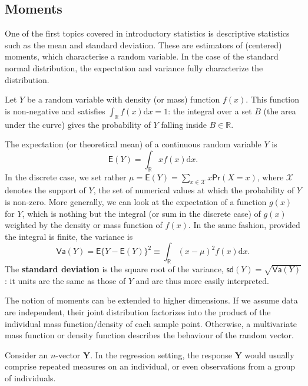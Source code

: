 \documentclass[
  11pt,
  letterpaper,
]{book}
\theoremstyle{definition}
\theoremstyle{definition}
\theoremstyle{definition}
\theoremstyle{definition}
\theoremstyle{remark}
\begin{document}
\hypertarget{moments}{%
\subsection{Moments}\label{moments}}

One of the first topics covered in introductory statistics is descriptive statistics such as the mean and standard deviation. These are estimators of (centered) moments, which characterise a random variable. In the case of the standard normal distribution, the expectation and variance fully characterize the distribution.

Let \(Y\) be a random variable with density (or mass) function \(f(x)\). This function is non-negative and satisfies \(\int_{\mathbb{R}} f(x) \mathrm{d}x=1\): the integral over a set \(B\) (the area under the curve) gives the probability of \(Y\) falling inside \(B \in \mathbb{R}\).

The expectation (or theoretical mean) of a continuous random variable \(Y\) is \[\mathsf{E}(Y)=\int_{\mathbb{R}} x f(x) \mathrm{d} x.\]
In the discrete case, we set rather \(\mu = \mathsf{E}(Y)=\sum_{x \in \mathcal{X}} x \mathsf{Pr}(X=x)\), where \(\mathcal{X}\) denotes the support of \(Y\), the set of numerical values at which the probability of \(Y\) is non-zero.
More generally, we can look at the expectation of a function \(g(x)\) for \(Y\), which is nothing but the integral (or sum in the discrete case) of \(g(x)\) weighted by the density or mass function of \(f(x)\). In the same fashion, provided the integral is finite, the variance is
\[\mathsf{Va}(Y)=\mathsf{E}\{Y-\mathsf{E}(Y)\}^2 \equiv \int_{\mathbb{R}} (x-\mu)^2 f(x) \mathrm{d} x.\]
The \textbf{standard deviation} is the square root of the variance, \(\mathsf{sd}(Y)=\sqrt{\mathsf{Va}(Y)}\): it units are the same as those of \(Y\) and are thus more easily interpreted.

The notion of moments can be extended to higher dimensions. If we assume data are independent, their joint distribution factorizes into the product of the individual mass function/density of each sample point. Otherwise, a multivariate mass function or density function describes the behaviour of the random vector.

Consider an \(n\)-vector \(\boldsymbol{Y}\). In the regression setting, the response \(\boldsymbol{Y}\) would usually comprise repeated measures on an individual, or even observations from a group of individuals.
\end{document}
